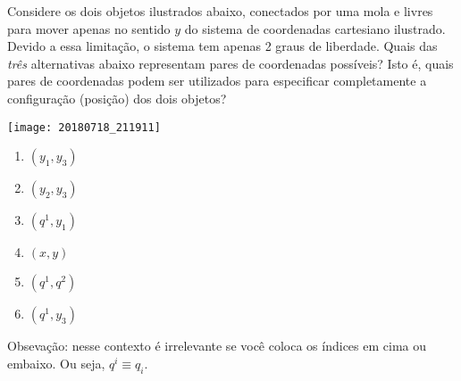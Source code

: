 \begin{question}
    Considere os dois objetos ilustrados abaixo, conectados por uma mola e livres para mover apenas no sentido $y$ do sistema de coordenadas cartesiano ilustrado.
    Devido a essa limitação, o sistema tem apenas 2 graus de liberdade.
    Quais das \emph{três} alternativas abaixo representam pares de coordenadas possíveis?
    Isto é, quais pares de coordenadas podem ser utilizados para especificar completamente a configuração (posição) dos dois objetos?

    \begin{center}
      \texttt{[image: 20180718\_211911]}
    \end{center}

    \begin{enumerate}
      \item $(y_1, y_3)$ \rightanswer
      \item $(y_2, y_3)$ \rightanswer
      \item $(q^1, y_1)$ \rightanswer
      \item $(x,y)$
      \item $(q^1, q^2)$
      \item $(q^1, y_3)$
    \end{enumerate}

    \bigskip
    \begin{compactdesc}
      \item[Obsevação:] nesse contexto é irrelevante se você coloca os índices em cima ou embaixo.
      Ou seja, $q^i \equiv q_i$.
    \end{compactdesc}


\end{question}
